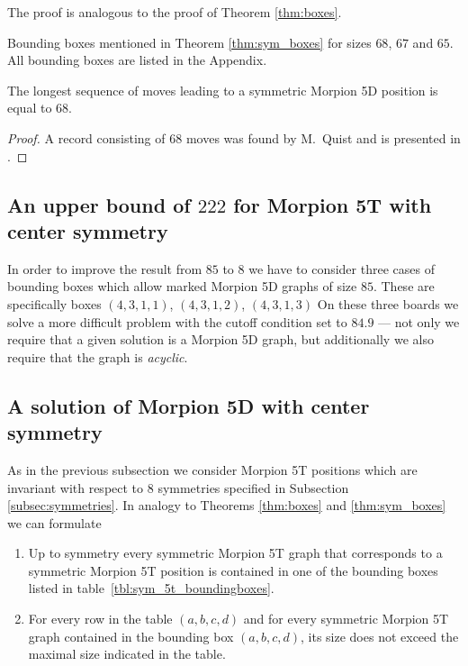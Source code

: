 The proof is analogous to the proof of Theorem \ref{thm:boxes}. 

\begin{table}[ht]
\centering
 

\caption{Bounding boxes mentioned in Theorem \ref{thm:sym_boxes} for sizes $68$, $67$ and $65$. All bounding boxes are listed in the Appendix. }
\label{tbl:sym_boundingboxes}
\end{table}

\begin{corollary}
\label{cor:68}
The longest sequence of moves leading to a symmetric Morpion 5D position is equal to $68$.
\end{corollary}
\begin{proof} 
A record consisting of $68$ moves was found by M.~Quist and is presented in \cite{boyer}. 
\end{proof}

\subsection{An upper bound of $222$ for Morpion 5T with center symmetry}

In order to improve the result from $85$ to $8$ we have to consider three cases of bounding boxes which allow marked Morpion 5D graphs of size $85$. These
are specifically boxes $(4,3,1,1)$, $(4,3,1,2)$, $(4,3,1,3)$  
On these three boards we solve a more difficult problem with the cutoff condition set to $84.9$ --- not only we require that a given solution is a 
Morpion 5D graph, but additionally we also require that the graph is {\em acyclic}. 

\subsection{A solution of Morpion 5D with center symmetry}
As in the previous subsection we consider Morpion 5T positions which are invariant with respect to $8$ symmetries 
specified in Subsection \ref{subsec:symmetries}. %
In analogy to Theorems \ref{thm:boxes} and \ref{thm:sym_boxes} we can formulate 
\begin{theorem}
\begin{enumerate}
\item Up to symmetry every symmetric Morpion 5T graph that corresponds to a symmetric Morpion 5T position
    is contained in one of the bounding boxes listed in table~\ref{tbl:sym_5t_boundingboxes}.
\item For every row in the table $(a,b,c,d)$ and for every symmetric Morpion 5T graph contained in the bounding box  $(a,b,c,d)$,
its size does not exceed the maximal size indicated in the table.
\end{enumerate} 
\label{thm:sym_5t_boxes}
\end{theorem}

